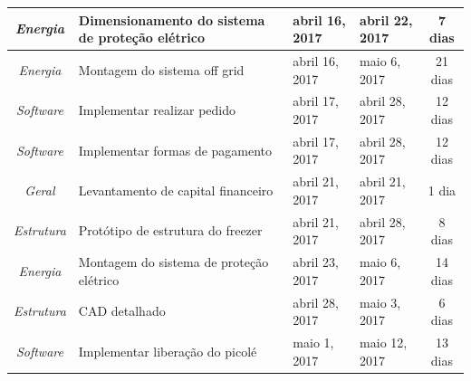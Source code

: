 \begin{longtable}{|c|m{6.5cm}|m{3.2cm}|m{3.2cm}|c|}
\textit{Energia}                                                          & Dimensionamento do sistema de proteção elétrico      & abril 16, 2017                       & abril 22, 2017                    & 7 dias                                \\ \hline
\textit{Energia}                                                          & Montagem do sistema off grid                         & abril 16, 2017                       & maio 6, 2017                      & 21 dias                               \\ \hline
\textit{Software}                                                         & Implementar realizar pedido                          & abril 17, 2017                       & abril 28, 2017                    & 12 dias                               \\ \hline
\textit{Software}                                                         & Implementar formas de pagamento                      & abril 17, 2017                       & abril 28, 2017                    & 12 dias                               \\ \hline
\textit{Geral}                                                            & Levantamento de capital financeiro                   & abril 21, 2017                       & abril 21, 2017                    & 1 dia                                 \\ \hline
\textit{Estrutura}                                                        & Protótipo de estrutura do freezer                    & abril 21, 2017                       & abril 28, 2017                    & 8 dias                                \\ \hline
\textit{Energia}                                                          & Montagem do sistema de proteção elétrico             & abril 23, 2017                       & maio 6, 2017                      & 14 dias                               \\ \hline
\textit{Estrutura}                                                        & CAD detalhado                                        & abril 28, 2017                       & maio 3, 2017                      & 6 dias                                \\ \hline
\textit{Software}                                                         & Implementar liberação do picolé                      & maio 1, 2017                         & maio 12, 2017                     & 13 dias                               \\ \hline

\end{longtable}
